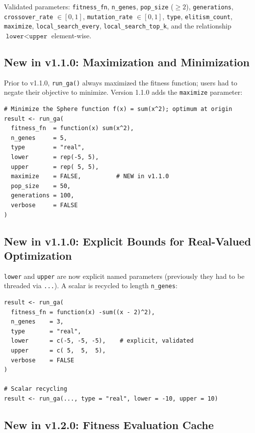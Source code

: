 \documentclass[11pt,a4paper]{article}
\begin{document}
Validated parameters: \texttt{fitness\_fn}, \texttt{n\_genes},
\texttt{pop\_size} ($\geq 2$), \texttt{generations}, \texttt{crossover\_rate}
$\in [0,1]$, \texttt{mutation\_rate} $\in [0,1]$, \texttt{type},
\texttt{elitism\_count}, \texttt{maximize}, \texttt{local\_search\_every},
\texttt{local\_search\_top\_k}, and the relationship $\texttt{lower} <
\texttt{upper}$ element-wise.

\subsection{New in v1.1.0: Maximization and Minimization}

Prior to v1.1.0, \texttt{run\_ga()} always maximized the fitness function;
users had to negate their objective to minimize. Version 1.1.0 adds the
\texttt{maximize} parameter:

\begin{lstlisting}
# Minimize the Sphere function f(x) = sum(x^2); optimum at origin
result <- run_ga(
  fitness_fn  = function(x) sum(x^2),
  n_genes     = 5,
  type        = "real",
  lower       = rep(-5, 5),
  upper       = rep( 5, 5),
  maximize    = FALSE,          # NEW in v1.1.0
  pop_size    = 50,
  generations = 100,
  verbose     = FALSE
)
\end{lstlisting}

\subsection{New in v1.1.0: Explicit Bounds for Real-Valued Optimization}

\texttt{lower} and \texttt{upper} are now explicit named parameters
(previously they had to be threaded via \texttt{...}). A scalar is recycled
to length \texttt{n\_genes}:

\begin{lstlisting}
result <- run_ga(
  fitness_fn = function(x) -sum((x - 2)^2),
  n_genes    = 3,
  type       = "real",
  lower      = c(-5, -5, -5),    # explicit, validated
  upper      = c( 5,  5,  5),
  verbose    = FALSE
)

# Scalar recycling
result <- run_ga(..., type = "real", lower = -10, upper = 10)
\end{lstlisting}

\subsection{New in v1.2.0: Fitness Evaluation Cache}
\label{sec:cache}
\end{document}
